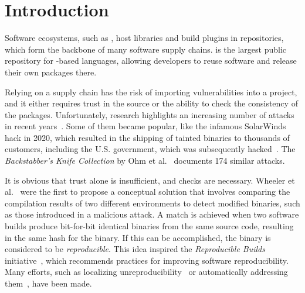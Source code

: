 \documentclass[smallextended]{svjour3}
\newcommand{\maven}[1]{\tool{Maven{#1}}}
\newcommand{\central}{\tool{Maven Central}}
\begin{document}
\section{Introduction}
\label{sec:introduction}


Software ecosystems, such as \maven{}, host libraries and build plugins in repositories, which form the backbone of many software supply chains. \central{} is the largest public repository for -based languages, allowing developers to reuse software and release their own packages there.

Relying on a supply chain has the risk of importing vulnerabilities into a project, and it either requires trust in the source or the ability to check the consistency of the packages. Unfortunately, research highlights an increasing number of attacks in recent years~\cite{lamb2021reproducible}. Some of them became popular, like the infamous SolarWinds hack in 2020, which resulted in the shipping of tainted binaries to thousands of customers, including the U.S. government, which was subsequently hacked~\cite{solarWindsAttack}. The \emph{Backstabber's Knife Collection} by Ohm et al.~\cite{ohm2020backstabber} documents 174 similar attacks.

It is obvious that trust alone is insufficient, and checks are necessary. Wheeler et al.~\cite{wheeler2005countering} were the first to propose a conceptual solution that involves comparing the compilation results of two different environments to detect modified binaries, such as those introduced in a malicious attack. A match is achieved when two software builds produce bit-for-bit identical binaries from the same source code, resulting in the same hash for the binary. If this can be accomplished, the binary is considered to be {\it reproducible}. 
This idea inspired the \emph{Reproducible Builds} initiative~\cite{reproducibleBuilds}, which recommends practices for improving software reproducibility. Many efforts, such as localizing unreproducibility~\cite{ren2018automated,ren2019root} or automatically addressing them~\cite{Ren2022Automated}, have been made.
\end{document}
